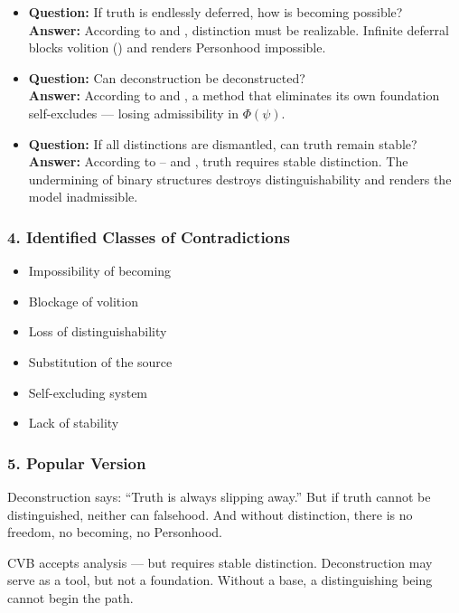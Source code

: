\documentclass[12pt]{article}
\begin{document}
\begin{itemize}
\item \textbf{Question:} If truth is endlessly deferred, how is becoming possible?  
\\ \textbf{Answer:} According to \text{[3]} and \text{[4.1]}, distinction must be realizable. Infinite deferral blocks volition (\text{[12.2]}) and renders Personhood impossible.

\item \textbf{Question:} Can deconstruction be deconstructed?  
\\ \textbf{Answer:} According to \text{[2]} and \text{[11.1.1.2]}, a method that eliminates its own foundation self-excludes — losing admissibility in $\Phi(\psi)$.

\item \textbf{Question:} If all distinctions are dismantled, can truth remain stable?  
\\ \textbf{Answer:} According to \text{[1]}–\text{[4]} and \text{[11.2]}, truth requires stable distinction. The undermining of binary structures destroys distinguishability and renders the model inadmissible.
\end{itemize}

\subsubsection*{4. Identified Classes of Contradictions}

\begin{itemize}
\item Impossibility of becoming
\item Blockage of volition
\item Loss of distinguishability
\item Substitution of the source
\item Self-excluding system
\item Lack of stability
\end{itemize}

\subsubsection*{5. Popular Version}

Deconstruction says: ``Truth is always slipping away.'' But if truth cannot be distinguished, neither can falsehood. And without distinction, there is no freedom, no becoming, no Personhood.

CVB accepts analysis — but requires stable distinction. Deconstruction may serve as a tool, but not a foundation. Without a base, a distinguishing being cannot begin the path.
\end{document}
